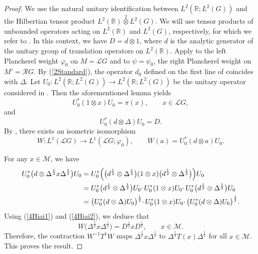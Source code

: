 \documentclass[12pt]{amsart}
\newcommand{\Rdb}{\mbox{$\mathbb{R}$}}
\newcommand{\M}{\mbox{${\mathcal M}$}}
\theoremstyle{remark}
\theoremstyle{definition}
\numberwithin{equation}{section}
\begin{document}
\begin{proof}
We use the natural unitary identification between $L^2(\Rdb;L^2(G))$
and the Hilbertian tensor product $L^2(\Rdb)\overset{2}{\otimes} L^2(G)$.
We will use tensor products of unbounded operators acting on 
$L^2(\Rdb)$ and $L^2(G)$, respectively, for which we refer to \cite[Remark 11.33]{Hiai}.
In this context, we have $D=d\otimes 1$, where $d$  is the analytic generator of the unitary group of
translation operators on $L^2(\Rdb)$. Apply \cite[pp. 204-206]{Hiai} to the left Plancherel weight $\varphi_0$ on $M={\mathcal L}G$ and to
$\psi=\psi_0$, the right Plancherel weight on $M'={\mathcal R}G$.
By (\ref{2Standard}), the operator 
$d_0$ defined on the first line of \cite[p. 204]{Hiai} 
coincides with $\Delta$. 
Let $U_0\colon L^2(\Rdb;L^2(G))\to L^2(\Rdb;L^2(G))$ be the unitary operator
considered in \cite[Lemma 11.30]{Hiai}. Then the aforementioned  lemma yields
\begin{equation}\label{4Hiai1}
U_0^*(1\otimes x)U_0=\pi(x),\qquad x\in {\mathcal L}G,
\end{equation}
and 
\begin{equation}\label{4Hiai2}
U_0^*(d\otimes\Delta)U_0 =D.
\end{equation}
By \cite[Lemma 11.32]{Hiai}, there exists an isometric isomorphism  
$$
W\colon L^1({\mathcal L}G)\longrightarrow 
L^1({\mathcal L}G;\varphi_0),\qquad W(a)= U_0^*(d\otimes a)U_0.
$$
 
For any $x\in\M$, we have
\begin{align*}
U_0^*\bigl(d\otimes \Delta^{\frac{1}{2}} x\Delta^{\frac{1}{2}}\bigr)U_0
& = 
U_0^*\Bigl(\bigl(d^{\frac{1}{2}}\otimes \Delta^{\frac{1}{2}}\bigr)(1\otimes x)
\bigl(d^{\frac{1}{2}}\otimes \Delta^{\frac{1}{2}}\bigr)\Bigr)U_0\\
& = 
U_0^*\bigl(d^{\frac{1}{2}}\otimes \Delta^{\frac{1}{2}}\bigr)U_0\cdotp U_0^*
(1\otimes x)U_0\cdotp U_0^*\bigl(d^{\frac{1}{2}}\otimes \Delta^{\frac{1}{2}}\bigr)U_0\\
& = 
\bigl(U_0^*(d\otimes \Delta)U_0\bigr)^{\frac{1}{2}} \cdotp U_0^*
(1\otimes x)U_0\cdotp \bigl(U_0^*(d\otimes \Delta)U_0\bigr)^{\frac{1}{2}}.
\end{align*}
Using (\ref{4Hiai1}) and (\ref{4Hiai2}), we deduce that 
$$
W\bigl(\Delta^\frac12 x\Delta^\frac12\bigr)  =
D^\frac12 x D^\frac12,\qquad x\in\M.
$$
Therefore, the contraction $W^{-1}T^1W$ maps $\Delta^\frac12 x\Delta^\frac12$
to $\Delta^\frac12 T(x)\Delta^\frac12$ for all $x\in\M$.
This proves the result.
\end{proof}
\end{document}
